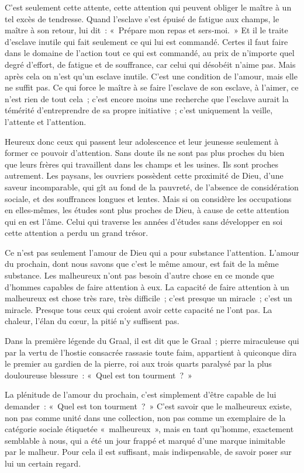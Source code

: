 \documentclass[french,twoside]{book} %
\begin{document}
C'est seulement cette attente, cette attention qui peuvent obliger le maître à un tel excès de tendresse. Quand l'esclave s'est épuisé de fatigue aux champs, le maître à son retour, lui dit : « Prépare mon repas et sers-moi. » Et il le traite d'esclave inutile qui fait seulement ce qui lui est commandé. Certes il faut faire dans le domaine de l'action tout ce qui est commandé, au prix de n'importe quel degré d'effort, de fatigue et de souffrance, car celui qui désobéit n'aime pas. Mais après cela on n'est qu'un esclave inutile. C'est une condition de l'amour, mais elle ne suffit pas. Ce qui force le maître à se faire l'esclave de son esclave, à l'aimer, ce n'est rien de tout cela ; c'est encore moins une recherche que l'esclave aurait la témérité d'entreprendre de sa propre initiative ; c'est uniquement la veille, l'attente et l'attention.\par
Heureux donc ceux qui passent leur adolescence et leur jeunesse seulement à former ce pouvoir d'attention. Sans doute ils ne sont pas plus proches du bien que leurs frères qui travaillent dans les champs et les usines. Ils sont proches autrement. Les paysans, les ouvriers possèdent cette proximité de Dieu, d'une saveur incomparable, qui gît au fond de la pauvreté, de l'absence de considération sociale, et des souffrances longues et lentes. Mais si on considère les occupations en elles-mêmes, les études sont plus proches de Dieu, à cause de cette attention qui en est l'âme. Celui qui traverse les années d'études sans développer en soi cette attention a perdu un grand trésor.\par
Ce n'est pas seulement l'amour de Dieu qui a pour substance l'attention. L'amour du prochain, dont nous savons que c'est le même amour, est fait de la même substance. Les malheureux n'ont pas besoin d'autre chose en ce monde que d'hommes capables de faire attention à eux. La capacité de faire attention à un malheureux est chose très rare, très difficile ; c'est presque un miracle ; c'est un miracle. Presque tous ceux qui croient avoir cette capacité ne l'ont pas. La chaleur, l'élan du cœur, la pitié n'y suffisent pas.\par
Dans la première légende du Graal, il est dit que le Graal ; pierre miraculeuse qui par la vertu de l'hostie consacrée rassasie toute faim, appartient à quiconque dira le premier au gardien de la pierre, roi aux trois quarts paralysé par la plus douloureuse blessure : « Quel est ton tourment ? »\par
La plénitude de l'amour du prochain, c'est simplement d'être capable de lui demander : « Quel est ton tourment ? » C'est savoir que le malheureux existe, non pas comme unité dans une collection, non pas comme un exemplaire de la catégorie sociale étiquetée « malheu­reux », mais en tant qu'homme, exactement semblable à nous, qui a été un jour frappé et marqué d'une marque inimitable par le malheur. Pour cela il est suffisant, mais indispensable, de savoir poser sur lui un certain regard.\par
\end{document}
